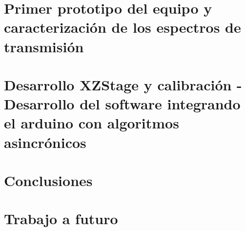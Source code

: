 \documentclass{ctuthesis}
\begin{document}
\maketitle

\renewcommand{\chaptername}{Capítulo}
\renewcommand{\figurename}{Figura}


\setlength{\parindent}{0.5cm}
\setlength{\parskip}{1em}






\chapter{Primer prototipo del equipo y caracterización de los espectros de transmisión}





\chapter{Desarrollo XZStage y calibración - Desarrollo del software integrando el arduino con algoritmos asincrónicos}








\chapter{Conclusiones}

\chapter{Trabajo a futuro}

\renewcommand\bibname{Referencias Bibliográficas}


\end{document}
